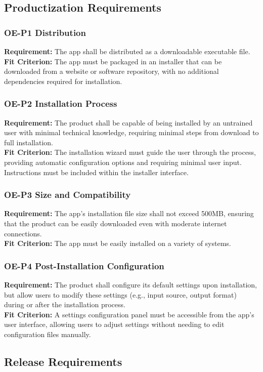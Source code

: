 \documentclass[12pt]{article}
\begin{document}
\subsection{Productization Requirements}
\subsubsection*{OE-P1 Distribution}
\textbf{Requirement:} The app shall be distributed as a downloadable executable file.\\
\textbf{Fit Criterion:} The app must be packaged in an installer that can be downloaded from a website or software repository, with no additional dependencies required for installation.
\subsubsection*{OE-P2 Installation Process}
\textbf{Requirement:} The product shall be capable of being installed by an untrained user with minimal technical knowledge, requiring minimal steps from download to full installation.\\
\textbf{Fit Criterion:} The installation wizard must guide the user through the process, providing automatic configuration options and requiring minimal user input. Instructions must be included within the installer interface.
\subsubsection*{OE-P3 Size and Compatibility}
\textbf{Requirement:} The app’s installation file size shall not exceed 500MB, ensuring that the product can be easily downloaded even with moderate internet connections.\\
\textbf{Fit Criterion:} The app must be easily installed on a variety of systems.
\subsubsection*{OE-P4 Post-Installation Configuration}
\textbf{Requirement:} The product shall configure its default settings upon installation, but allow users to modify these settings (e.g., input source, output format) during or after the installation process.\\
\textbf{Fit Criterion:} A settings configuration panel must be accessible from the app's user interface, allowing users to adjust settings without needing to edit configuration files manually.

\subsection{Release Requirements}
\end{document}
